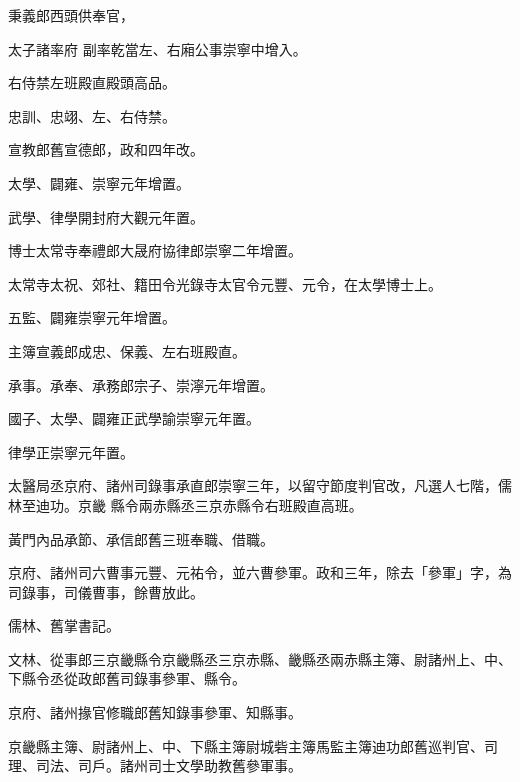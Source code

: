 \begin{pinyinscope}
 秉義郎西頭供奉官，



 太子諸率府
 副率乾當左、右廂公事崇寧中增入。



 右侍禁左班殿直殿頭高品。



 忠訓、忠翊、左、右侍禁。



 宣教郎舊宣德郎，政和四年改。



 太學、闢雍、崇寧元年增置。



 武學、律學開封府大觀元年置。



 博士太常寺奉禮郎大晟府協律郎崇寧二年增置。



 太常寺太祝、郊社、籍田令光錄寺太官令元豐、元令，在太學博士上。



 五監、闢雍崇寧元年增置。



 主簿宣義郎成忠、保義、左右班殿直。



 承事。承奉、承務郎宗子、崇濘元年增置。



 國子、太學、闢雍正武學諭崇寧元年置。



 律學正崇寧元年置。



 太醫局丞京府、諸州司錄事承直郎崇寧三年，以留守節度判官改，凡選人七階，儒林至迪功。京畿
 縣令兩赤縣丞三京赤縣令右班殿直高班。



 黃門內品承節、承信郎舊三班奉職、借職。



 京府、諸州司六曹事元豐、元祐令，並六曹參軍。政和三年，除去「參軍」字，為司錄事，司儀曹事，餘曹放此。



 儒林、舊掌書記。



 文林、從事郎三京畿縣令京畿縣丞三京赤縣、畿縣丞兩赤縣主簿、尉諸州上、中、下縣令丞從政郎舊司錄事參軍、縣令。



 京府、諸州掾官修職郎舊知錄事參軍、知縣事。



 京畿縣主簿、尉諸州上、中、下縣主簿尉城砦主簿馬監主簿迪功郎舊巡判官、司理、司法、司戶。諸州司士文學助教舊參軍事。




\end{pinyinscope}
